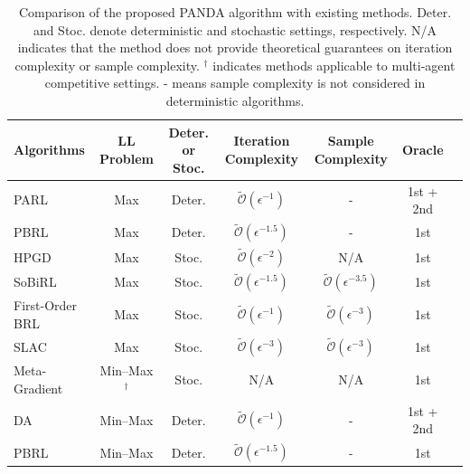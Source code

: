 \documentclass{article}
\theoremstyle{plain}
\theoremstyle{definition}
\theoremstyle{remark}
\def\cO{\mathcal O}
\begin{document}
\begin{table}[t]
\vspace{-2mm}
  \label{table: algorithm-comparison}
      \caption{Comparison of the proposed PANDA algorithm with existing methods. Deter. and Stoc. denote deterministic and stochastic settings, respectively. N/A indicates that the method does not provide theoretical guarantees on iteration complexity or sample complexity. $^\dag$ indicates methods applicable to multi-agent competitive settings. - means sample complexity is not considered in deterministic algorithms.}    
  \begin{center}
    \begin{small}
        \begin{threeparttable}
        \vspace{-4mm}
         \begin{tabular}{lcccccc}
            \toprule
            Algorithms & LL Problem  & Deter. or Stoc.   &  Iteration  Complexity & Sample Complexity  & Oracle \\
            \midrule
            PARL \citep{chakraborty2024parl} & Max   & Deter. & $\tilde{\cO}(\epsilon^{-1})$ & - & 1st + 2nd\\
            PBRL \citep{shen2025principled} & Max & Deter. & $\tilde{\cO}(\epsilon^{-1.5})$ & - & 1st\\
            HPGD \citep{thoma2024contextual} & Max & Stoc. & $\tilde{\cO}(\epsilon^{-2})$ & N/A & 1st\\
            SoBiRL \citep{yang2025bilevel} & Max & Stoc. & $\tilde{\cO}(\epsilon^{-1.5})$ & $\tilde{\cO}(\epsilon^{-3.5})$ & 1st\\
            First-Order BRL \citep{gaur2025on} & Max  & Stoc.& $\tilde{\cO}(\epsilon^{-1})$ & $\tilde{\cO}(\epsilon^{-3})$& 1st\\  
            SLAC \citep{zeng2025regularized}  & Max  & Stoc. & $\tilde{\cO}(\epsilon^{-3})$ & $\tilde{\cO}(\epsilon^{-3})$ & 1st\\
            \midrule
            Meta-Gradient \citep{yang2022adaptive} & Min--Max $^\dag$ & Stoc. & N/A & N/A & 1st \\
            DA \citep{wang2023differentiable} & Min--Max  & Deter. & $\tilde{\cO}(\epsilon^{-1})$ & - & 1st + 2nd\\
            PBRL \citep{shen2025principled} & Min--Max  & Deter. & $\tilde{\cO}(\epsilon^{-1.5})$ & -& 1st\\

\end{tabular}
\end{threeparttable}
\end{small}
\end{center}
\end{table}
\end{document}
